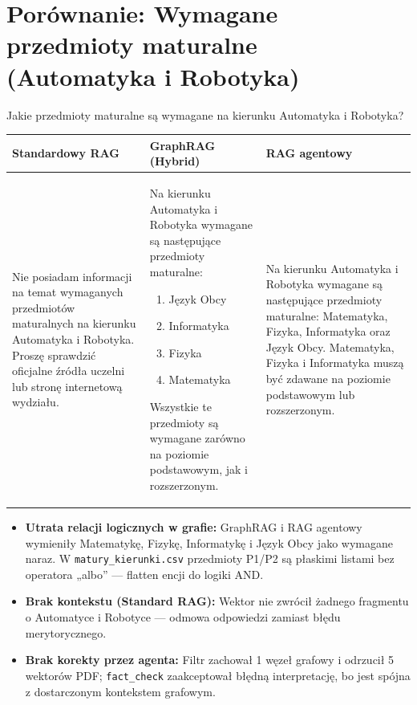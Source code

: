 \newpage
\section*{Porównanie: Wymagane przedmioty maturalne (Automatyka i Robotyka)}

\begin{tcolorbox}[colback=blue!5!white,colframe=blue!75!black,title=Pytanie użytkownika]
    Jakie przedmioty maturalne są wymagane na kierunku Automatyka i Robotyka?
\end{tcolorbox}

\noindent
\begin{tabularx}{\textwidth}{@{} >{\raggedright\arraybackslash}X >{\raggedright\arraybackslash}X >{\raggedright\arraybackslash}X @{}}
    \toprule
    \textbf{Standardowy RAG} & \textbf{GraphRAG (Hybrid)} & \textbf{RAG agentowy} \\
    \midrule
    \footnotesize Nie posiadam informacji na temat wymaganych przedmiotów maturalnych na kierunku Automatyka i Robotyka. Proszę sprawdzić oficjalne źródła uczelni lub stronę internetową wydziału. & \begin{minipage}[t]{\linewidth}\footnotesize Na kierunku Automatyka i Robotyka wymagane są następujące przedmioty maturalne:
\begin{enumerate}
\item Język Obcy
\item Informatyka
\item Fizyka
\item Matematyka
\end{enumerate}
Wszystkie te przedmioty są wymagane zarówno na poziomie podstawowym, jak i rozszerzonym.\end{minipage} & \footnotesize Na kierunku Automatyka i Robotyka wymagane są następujące przedmioty maturalne: Matematyka, Fizyka, Informatyka oraz Język Obcy. Matematyka, Fizyka i Informatyka muszą być zdawane na poziomie podstawowym lub rozszerzonym. \\
    \bottomrule
\end{tabularx}

\begin{tcolorbox}[colback=red!5!white,colframe=red!50!black,title=Wnioski i obserwacje]
    \begin{itemize}
        \item \textbf{Utrata relacji logicznych w grafie:} GraphRAG i RAG agentowy wymieniły Matematykę, Fizykę, Informatykę i Język Obcy jako wymagane naraz. W \texttt{matury\_kierunki.csv} przedmioty P1/P2 są płaskimi listami bez operatora „albo'' --- flatten encji do logiki AND.
        \item \textbf{Brak kontekstu (Standard RAG):} Wektor nie zwrócił żadnego fragmentu o Automatyce i Robotyce --- odmowa odpowiedzi zamiast błędu merytorycznego.
        \item \textbf{Brak korekty przez agenta:} Filtr zachował 1 węzeł grafowy i odrzucił 5 wektorów PDF; \texttt{fact\_check} zaakceptował błędną interpretację, bo jest spójna z dostarczonym kontekstem grafowym.
    \end{itemize}
\end{tcolorbox}
\vspace{1em}


